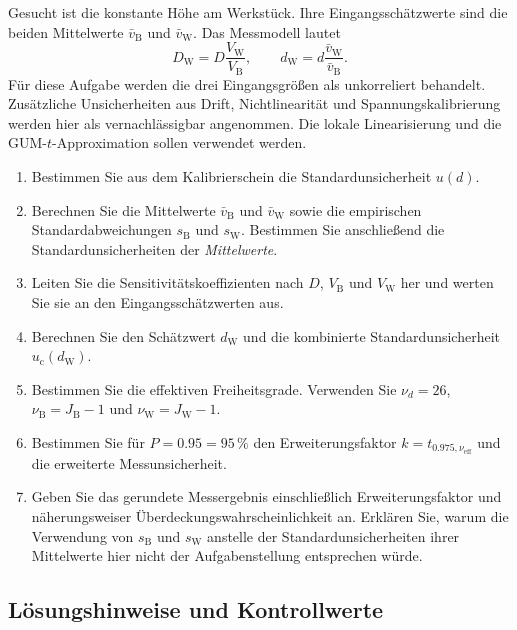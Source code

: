 Gesucht ist die konstante Höhe am Werkstück. Ihre Eingangsschätzwerte sind
die beiden Mittelwerte $\bar v_{\mathrm B}$ und $\bar v_{\mathrm W}$.
Das Messmodell lautet
\begin{equation}
D_{\mathrm W}=D\frac{V_{\mathrm W}}{V_{\mathrm B}},\qquad
d_{\mathrm W}=d\frac{\bar v_{\mathrm W}}{\bar v_{\mathrm B}}.
\end{equation}
Für diese Aufgabe werden die drei Eingangsgrößen als unkorreliert
behandelt. Zusätzliche Unsicherheiten aus Drift, Nichtlinearität und
Spannungskalibrierung werden hier als vernachlässigbar angenommen. Die
lokale Linearisierung und die GUM-$t$-Approximation sollen verwendet werden.

\begin{enumerate}
\item[a)] Bestimmen Sie aus dem Kalibrierschein die Standardunsicherheit
$u(d)$.
\item[b)] Berechnen Sie die Mittelwerte $\bar v_{\mathrm B}$ und
$\bar v_{\mathrm W}$ sowie die empirischen Standardabweichungen
$s_{\mathrm B}$ und $s_{\mathrm W}$. Bestimmen Sie anschließend die
Standardunsicherheiten der \emph{Mittelwerte}.
\item[c)] Leiten Sie die Sensitivitätskoeffizienten nach $D$,
$V_{\mathrm B}$ und $V_{\mathrm W}$ her und werten Sie sie an den
Eingangsschätzwerten aus.
\item[d)] Berechnen Sie den Schätzwert $d_{\mathrm W}$ und die kombinierte
Standardunsicherheit $u_{\mathrm c}(d_{\mathrm W})$.
\item[e)] Bestimmen Sie die effektiven Freiheitsgrade. Verwenden Sie
$\nu_d=26$, $\nu_{\mathrm B}=J_{\mathrm B}-1$ und
$\nu_{\mathrm W}=J_{\mathrm W}-1$.
\item[f)] Bestimmen Sie für $P=0.95=95\,\%$ den Erweiterungsfaktor
$k=t_{0.975,\nu_{\mathrm{eff}}}$ und die erweiterte Messunsicherheit.
\item[g)] Geben Sie das gerundete Messergebnis einschließlich
Erweiterungsfaktor und näherungsweiser Überdeckungswahrscheinlichkeit an.
Erklären Sie, warum die Verwendung von $s_{\mathrm B}$ und
$s_{\mathrm W}$ anstelle der Standardunsicherheiten ihrer Mittelwerte
hier nicht der Aufgabenstellung entsprechen würde.
\end{enumerate}

\subsection{Lösungshinweise und Kontrollwerte}

